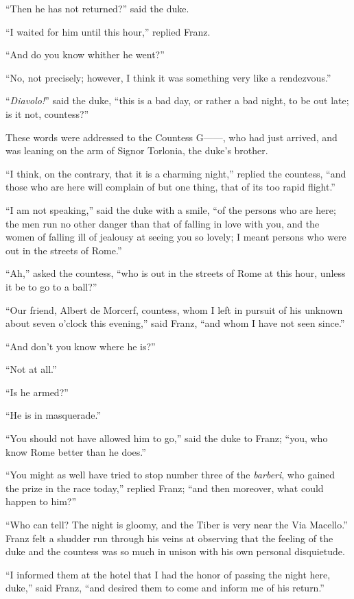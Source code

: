 “Then he has not returned?” said the duke.

“I waited for him until this hour,” replied Franz.

“And do you know whither he went?”

“No, not precisely; however, I think it was something very like a
rendezvous.”

“\textit{Diavolo!}” said the duke, “this is a bad day, or rather a bad night,
to be out late; is it not, countess?”

These words were addressed to the Countess G——, who had just arrived,
and was leaning on the arm of Signor Torlonia, the duke’s brother.

“I think, on the contrary, that it is a charming night,” replied the
countess, “and those who are here will complain of but one thing, that
of its too rapid flight.”

“I am not speaking,” said the duke with a smile, “of the persons who
are here; the men run no other danger than that of falling in love with
you, and the women of falling ill of jealousy at seeing you so lovely;
I meant persons who were out in the streets of Rome.”

“Ah,” asked the countess, “who is out in the streets of Rome at this
hour, unless it be to go to a ball?”

“Our friend, Albert de Morcerf, countess, whom I left in pursuit of his
unknown about seven o’clock this evening,” said Franz, “and whom I have
not seen since.”

“And don’t you know where he is?”

“Not at all.”

“Is he armed?”

“He is in masquerade.”

“You should not have allowed him to go,” said the duke to Franz; “you,
who know Rome better than he does.”

“You might as well have tried to stop number three of the \textit{barberi},
who gained the prize in the race today,” replied Franz; “and then
moreover, what could happen to him?”

“Who can tell? The night is gloomy, and the Tiber is very near the Via
Macello.” Franz felt a shudder run through his veins at observing that
the feeling of the duke and the countess was so much in unison with his
own personal disquietude.

“I informed them at the hotel that I had the honor of passing the night
here, duke,” said Franz, “and desired them to come and inform me of his
return.”

